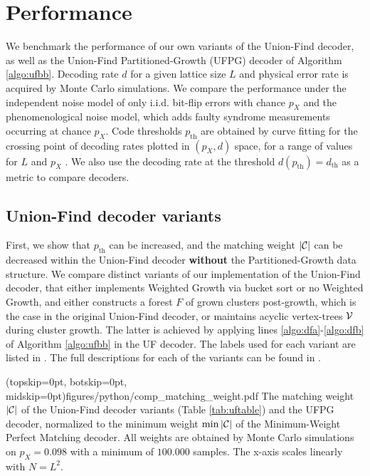 \section{Performance}\label{sec:performance}

We benchmark the performance of our own variants of the Union-Find decoder, as well as the Union-Find Partitioned-Growth (UFPG) decoder of Algorithm \ref{algo:ufbb}. Decoding rate $d$ for a given lattice size $L$ and physical error rate is acquired by Monte Carlo simulations. We compare the performance under the independent noise model of only i.i.d. bit-flip errors with chance $p_X$ and the phenomenological noise model, which adds faulty syndrome measurements occurring at chance $p_X$. Code thresholds $p_{\text{th}}$ are obtained by curve fitting for the crossing point of decoding rates plotted in $(p_X, d)$ space, for a range of values for $L$ and $p_X$ \cite{wang2003confinement}. We also use the decoding rate at the threshold $d(p_{\text{th}})= d_{\text{th}}$ as a metric to compare decoders. 

\subsection{Union-Find decoder variants}

First, we show that $p_{\text{th}}$ can be increased, and the matching weight $\lvert\mathcal{C}\rvert$ can be decreased within the Union-Find decoder \textbf{without} the Partitioned-Growth data structure. We compare distinct variants of our implementation of the Union-Find decoder, that either implements Weighted Growth via bucket sort or no Weighted Growth, and either constructs a forest $F$ of grown clusters post-growth, which is the case in the original Union-Find decoder, or maintains acyclic vertex-trees $\mathcal{V}$ during cluster growth. The latter is achieved by applying lines \ref{algo:dfa}-\ref{algo:dfb} of Algorithm \ref{algo:ufbb} in the UF decoder. The labels used for each variant are listed in . The full descriptions for each of the variants can be found in \cite{markthesis}.

\Figure[b](topskip=0pt, botskip=0pt, midskip=0pt){figures/python/comp_matching_weight.pdf}{
  The matching weight $\lvert\mathcal{C}\rvert$ of the Union-Find decoder variants (Table \ref{tab:uftable}) and the UFPG decoder, normalized to the minimum weight $\min{\lvert\mathcal{C}\rvert}$ of the Minimum-Weight Perfect Matching decoder. All weights are obtained by Monte Carlo simulations on $p_X=0.098$ with a minimum of $100.000$ samples. The x-axis scales linearly with $N = L^2$. \label{comp_weight}}

